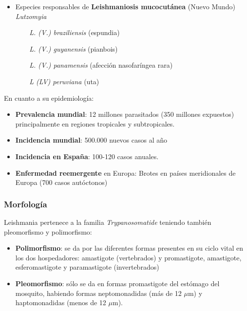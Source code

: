 \begin{itemize}[itemsep=0pt,parsep=0pt,topsep=0pt,partopsep=0pt]
\begin{multicols}{2}
\begin{itemize}[itemsep=0pt,parsep=0pt,topsep=0pt,partopsep=0pt]
			\item[$ $] \textit{L. (qL.) venezuelensis}
			\item[$ $] \textit{L. (L.) pifanoi}
		\end{itemize}
	\end{multicols}
	\vspace*{-0.5cm}
	\item Especies responsables de \textbf{Leishmaniosis mucocutánea} (Nuevo Mundo) \textit{Lutzomyia}
	\begin{itemize}[itemsep=0pt,parsep=0pt,topsep=0pt,partopsep=0pt]
		\item[$ $] \textit{L. (V.) braziliensis} (espundia)
		\item[$ $] \textit{L. (V.) guyanensis} (pianbois)
		\item[$ $] \textit{L. (V.) panamensis} (afección nasofaríngea rara)
		\item[$ $] \textit{L (LV) peruviana} (uta)
	\end{itemize}
\end{itemize}

En cuanto a su epidemiología:
\begin{itemize}[itemsep=0pt,parsep=0pt,topsep=0pt,partopsep=0pt] 
	\item \textbf{Prevalencia mundial}: 12 millones parasitados (350 millones expuestos) principalmente en regiones tropicales y subtropicales.
	\item \textbf{Incidencia mundial}: 500.000 nuevos casos al año
	\item \textbf{Incidencia en España}: 100-120 casos anuales.
	\item \textbf{Enfermedad reemergente} en Europa: Brotes en países meridionales de Europa (700 casos autóctonos)
\end{itemize}
\subsubsection{Morfología}
Leishmania pertenece a la familia \textit{Trypanosomatide} teniendo también pleomorfismo y polimorfismo:
\begin{itemize}[itemsep=0pt,parsep=0pt,topsep=0pt,partopsep=0pt] 
	\item \textbf{Polimorfismo}: se da por las diferentes formas presentes en su ciclo vital en los dos hospedadores: amastigote (vertebrados) y promastigote, amastigote, esferomastigote y paramastigote (invertebrados)
	\item \textbf{Pleomorfismo}: sólo se da en formas promastigote del estómago del mosquito, habiendo formas neptomonadidas (más de 12 $\mu$m) y haptomonadidas (menos de 12 $\mu$m).
\end{itemize}

